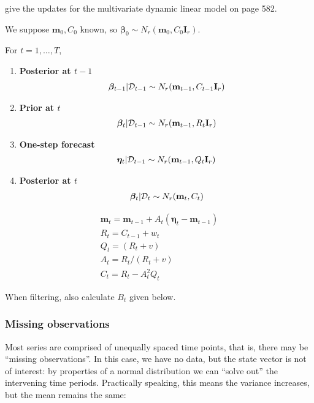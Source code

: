 \documentclass{article}
\begin{document}
\cite{west1997} give the updates for the multivariate dynamic
linear model on page 582.

We suppose $\mathbf{m}_{0},C_{0}$ known, so $\bm\beta_{0}\sim
N_{r}(\mathbf{m}_{0},C_{0}\mathbf{I}_{r})$.

For $t=1,\dots,T$,

\begin{enumerate}
\item \textbf{Posterior at $t-1$}
  \begin{gather}
  \bm\beta_{t-1}|{\cal D}_{t-1} \sim N_{r}(\mathbf{m}_{t-1}, C_{t-1}\mathbf{I}_{r})
\end{gather}

\item \textbf{Prior at $t$}
  \begin{gather}
  \bm\beta_{t}|{\cal D}_{t-1} \sim N_{r}(\mathbf{m}_{t-1},
  R_{t}\mathbf{I}_{r})
\end{gather}

\item \textbf{One-step forecast}
  \begin{gather}
    \bm\eta_{t} | {\cal D}_{t-1} \sim N_{r}(\mathbf{m}_{t-1}, Q_{t}
    \mathbf{I}_{r})
\end{gather}
\item \textbf{Posterior at $t$}
  \begin{gather} \bm\beta_{t}|{\cal D}_{t} \sim N_{r}(\mathbf{m}_{t}, C_{t}) \end{gather}
\end{enumerate}

\begin{gather}
  \mathbf{m}_{t} = \mathbf{m}_{t-1} + A_{t} (\bm\eta_{t} -
  \mathbf{m}_{t-1}) \\
  R_{t} = C_{t-1} + w_{t} \\
  Q_{t} = (R_{t} + v) \\
  A_{t} = R_{t} / (R_{t} + v) \\
  C_{t} = R_{t} - A_{t}^{2}Q_{t}
\end{gather}

When filtering, also calculate $B_{t}$ given below.

\subsubsection{Missing observations}

Most series are comprised of unequally spaced time points, that is,
there may be ``missing observations''. In this case, we
have no data, but the state vector is not of interest: by properties
of a normal distribution  we can ``solve out'' the intervening time
periods. Practically speaking, this means the variance increases, but
the mean remains the same:
\end{document}
